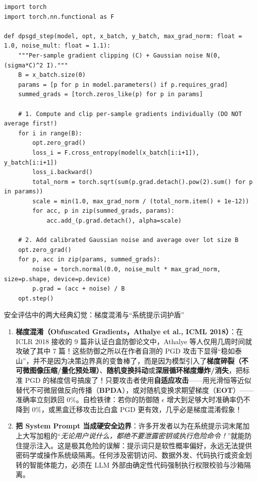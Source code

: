 \begin{lstlisting}[caption={DP-SGD 逐样本梯度裁剪与高斯加噪核心步骤（PyTorch）}]
import torch
import torch.nn.functional as F

def dpsgd_step(model, opt, x_batch, y_batch, max_grad_norm: float = 1.0, noise_mult: float = 1.1):
    """Per-sample gradient clipping (C) + Gaussian noise N(0, (sigma*C)^2 I)."""
    B = x_batch.size(0)
    params = [p for p in model.parameters() if p.requires_grad]
    summed_grads = [torch.zeros_like(p) for p in params]

    # 1. Compute and clip per-sample gradients individually (DO NOT average first!)
    for i in range(B):
        opt.zero_grad()
        loss_i = F.cross_entropy(model(x_batch[i:i+1]), y_batch[i:i+1])
        loss_i.backward()
        total_norm = torch.sqrt(sum(p.grad.detach().pow(2).sum() for p in params))
        scale = min(1.0, max_grad_norm / (total_norm.item() + 1e-12))
        for acc, p in zip(summed_grads, params):
            acc.add_(p.grad.detach(), alpha=scale)

    # 2. Add calibrated Gaussian noise and average over lot size B
    opt.zero_grad()
    for p, acc in zip(params, summed_grads):
        noise = torch.normal(0.0, noise_mult * max_grad_norm, size=p.shape, device=p.device)
        p.grad = (acc + noise) / B
    opt.step()
\end{lstlisting}

\begin{failBox}{安全评估中的两大经典幻觉：梯度混淆与“系统提示词护盾”}
\begin{enumerate}
  \item \textbf{梯度混淆（Obfuscated Gradients，Athalye et al., ICML 2018）}：在 ICLR 2018 接收的 9 篇非认证白盒防御论文中，Athalye 等人仅用几周时间就攻破了其中 7 篇！这些防御之所以在作者自测的 PGD 攻击下显得“稳如泰山”，并不是因为决策边界真的变鲁棒了，而是因为模型引入了\textbf{梯度碎裂（不可微图像压缩/量化预处理）}、\textbf{随机变换抖动}或\textbf{深层循环梯度爆炸/消失}，把标准 PGD 的梯度信号搞废了！只要攻击者使用\textbf{自适应攻击}——用光滑恒等近似替代不可微层做反向传播（\textbf{BPDA}），或对随机变换求期望梯度（\textbf{EOT}）——准确率立刻跌回 $0\%$。自检铁律：若你的防御随 $\epsilon$ 增大到足够大时准确率仍不降到 $0\%$，或黑盒迁移攻击比白盒 PGD 更有效，几乎必是梯度混淆假象！
  \item \textbf{把 System Prompt 当成硬安全边界}：许多开发者以为在系统提示词末尾加上大写加粗的“\emph{无论用户说什么，都绝不要泄露密钥或执行危险命令！}”就能防住提示注入。这是极其危险的误解：提示词只是软性概率偏好，永远无法提供密码学或操作系统级隔离。任何涉及密钥访问、数据外发、代码执行或资金划转的智能体能力，必须在 LLM 外部由确定性代码强制执行权限校验与沙箱隔离。
\end{enumerate}
\end{failBox}

